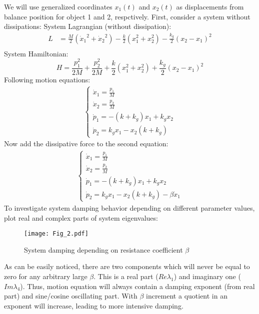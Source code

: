 \documentclass[]{article}
\begin{document}
We will use generalized coordinates $x_1(t)$ and $x_2(t)$ as displacements from balance position for  object 1 and 2, respctively.\newline
First, consider a system without dissipations: 
System Lagrangian (without dissipation):\newline
\begin{align*}
L &= \frac{M}{2}\left({\dot x_1}^2 + {\dot x_2}^2\right) - \frac{k}{2}\left(x_1^2 + x_2^2\right) - \frac{k_g}{2}\left(x_2-x_1\right)^2\\
\end{align*}
System Hamiltonian:
\begin{equation}
H = \frac{p_1^2}{2M} + \frac{p_2^2}{2M} + \frac{k}{2}\left(x_1^2 + x_2^2\right) + \frac{k_g}{2}\left(x_2 - x_1\right)^2
\end{equation}
Following motion equations:\newline
\begin{align*}
	\begin{cases}
		\dot x_1 = \frac{p_1}{M}
		\\
		\dot x_2 = \frac{p_2}{M}
		\\
		\dot p_1 = -(k+k_g)x_1 + k_g x_2
		\\
		\dot p_2 = k_gx_1 - x_2(k+k_g)
	\end{cases}
\end{align*}
Now add the dissipative force to the second equation:
\begin{align*}
	\begin{cases}
		\dot x_1 = \frac{p_1}{M}
		\\
		\dot x_2 = \frac{p_2}{M}
		\\
		\dot p_1 = -(k+k_g)x_1 + k_g x_2
		\\
		\dot p_2 = k_gx_1 - x_2(k+k_g) - \beta \dot x_1
	\end{cases}
\end{align*}
To investigate system damping behavior depending on different parameter values, plot real and complex parts of system eigenvalues:
\begin{figure}[h]
	\centering
	\texttt{[image: Fig\_2.pdf]}
	\caption{System damping depending on resistance coefficient $\beta$}
\end{figure}\newline

As can be easily noticed, there are two components which will never be equal to zero for any arbitrary large $\beta$. This is a real part ($Re \lambda_1$) and imaginary one ($Im \lambda_4$). Thus, motion equation will always contain a damping exponent (from real part) and sine/cosine oscillating part. With $\beta$ increment a quotient in an exponent will increase, leading to more intensive damping.
\end{document}
